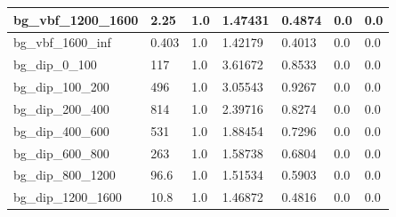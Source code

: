 \documentclass[a4paper, 10pt]{article}
\begin{document}
\begin{table}[H]
\begin{center}
\begin{tabular}{|m{23.0mm}|m{23.0mm}|m{18.0mm}|m{19.0mm}|m{19.0mm}|m{19.0mm}|m{19.0mm}|}
      \hline
      {\cellcolor{white}         bg\_vbf\_1200\_1600}& {\cellcolor{white}         2.25}& {\cellcolor{white}         1.0}& {\cellcolor{white}         1.47431}& {\cellcolor{white}         0.4874}& {\cellcolor{green}         0.0}& {\cellcolor{green}         0.0}\\
      \hline
      {\cellcolor{white}         bg\_vbf\_1600\_inf}& {\cellcolor{white}         0.403}& {\cellcolor{white}         1.0}& {\cellcolor{white}         1.42179}& {\cellcolor{white}         0.4013}& {\cellcolor{green}         0.0}& {\cellcolor{green}         0.0}\\
      \hline
      {\cellcolor{white}         bg\_dip\_0\_100}& {\cellcolor{white}         117}& {\cellcolor{white}         1.0}& {\cellcolor{white}         3.61672}& {\cellcolor{white}         0.8533}& {\cellcolor{green}         0.0}& {\cellcolor{green}         0.0}\\
      \hline
      {\cellcolor{white}         bg\_dip\_100\_200}& {\cellcolor{white}         496}& {\cellcolor{white}         1.0}& {\cellcolor{white}         3.05543}& {\cellcolor{white}         0.9267}& {\cellcolor{green}         0.0}& {\cellcolor{green}         0.0}\\
      \hline
      {\cellcolor{white}         bg\_dip\_200\_400}& {\cellcolor{white}         814}& {\cellcolor{white}         1.0}& {\cellcolor{white}         2.39716}& {\cellcolor{white}         0.8274}& {\cellcolor{green}         0.0}& {\cellcolor{green}         0.0}\\
      \hline
      {\cellcolor{white}         bg\_dip\_400\_600}& {\cellcolor{white}         531}& {\cellcolor{white}         1.0}& {\cellcolor{white}         1.88454}& {\cellcolor{white}         0.7296}& {\cellcolor{green}         0.0}& {\cellcolor{green}         0.0}\\
      \hline
      {\cellcolor{white}         bg\_dip\_600\_800}& {\cellcolor{white}         263}& {\cellcolor{white}         1.0}& {\cellcolor{white}         1.58738}& {\cellcolor{white}         0.6804}& {\cellcolor{green}         0.0}& {\cellcolor{green}         0.0}\\
      \hline
      {\cellcolor{white}         bg\_dip\_800\_1200}& {\cellcolor{white}         96.6}& {\cellcolor{white}         1.0}& {\cellcolor{white}         1.51534}& {\cellcolor{white}         0.5903}& {\cellcolor{green}         0.0}& {\cellcolor{green}         0.0}\\
      \hline
      {\cellcolor{white}         bg\_dip\_1200\_1600}& {\cellcolor{white}         10.8}& {\cellcolor{white}         1.0}& {\cellcolor{white}         1.46872}& {\cellcolor{white}         0.4816}& {\cellcolor{green}         0.0}& {\cellcolor{green}         0.0}\\

\end{tabular}
\end{center}
\end{table}
\end{document}
